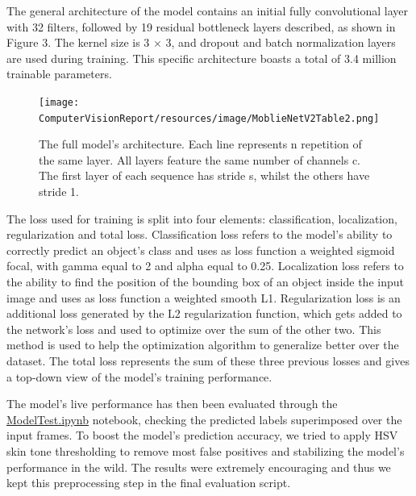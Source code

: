 \documentclass[a4paper, 12pt]{article}
\begin{document}
\begin{flushleft}
The general architecture of the model contains an initial fully convolutional layer with 32 filters, followed by 19 residual bottleneck layers described, as shown in Figure 3. The kernel size is 3 × 3, and dropout and batch normalization layers are used during training.
This specific architecture boasts a total of 3.4 million trainable parameters.

\begin{figure}[!h]
    \centering
    \texttt{[image: ComputerVisionReport/resources/image/MoblieNetV2Table2.png]} \caption{The full model's architecture. Each line represents n repetition of the same layer. All layers feature the same number of channels c. The first layer of each sequence has stride s, whilst the others have stride 1.}
\end{figure}
\label{figure2}

The loss used for training is split into four elements: classification, localization, regularization and total loss.
Classification loss refers to the model's ability to correctly predict an object's class and uses as loss function a weighted sigmoid focal, with gamma equal to 2 and alpha equal to 0.25.
Localization loss refers to the ability to find the position of the bounding box of an object inside the input image and uses as loss function a weighted smooth L1.
Regularization loss is an additional loss generated by the L2 regularization function, which gets added to the network's loss and used to optimize over the sum of the other two. This method is used to help the optimization algorithm to generalize better over the dataset.
The total loss represents the sum of these three previous losses and gives a top-down view of the model's training performance.\linebreak

The model's live performance has then been evaluated through the \href{https://github.com/MarzioVallero/ML-Based-Blender-Gestural-Input-Interface/blob/master/ModelTest.ipynb}{ModelTest.ipynb} notebook, checking the predicted labels superimposed over the input frames.\linebreak
To boost the model's prediction accuracy, we tried to apply HSV skin tone thresholding to remove most false positives and stabilizing the model's performance in the wild. The results were extremely encouraging and thus we kept this preprocessing step in the final evaluation script.

\end{flushleft}
\end{document}
